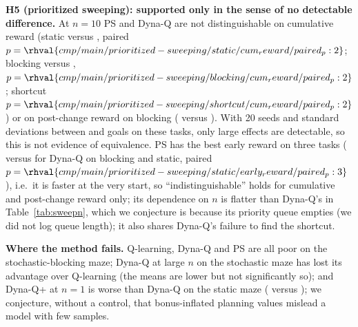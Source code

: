 \textbf{H5 (prioritized sweeping): supported only in the sense of no detectable difference.} At $n=10$ PS and Dyna-Q are not distinguishable on cumulative reward (static  versus , paired $p=\rhval{cmp/main/prioritized-sweeping/static/cum_reward/paired_p:2}$; blocking  versus , $p=\rhval{cmp/main/prioritized-sweeping/blocking/cum_reward/paired_p:2}$; shortcut $p=\rhval{cmp/main/prioritized-sweeping/shortcut/cum_reward/paired_p:2}$) or on post-change reward on blocking ( versus ). With 20 seeds and standard deviations between  and  goals on these tasks, only large effects are detectable, so this is not evidence of equivalence. PS has the best early reward on three tasks ( versus  for Dyna-Q on blocking and static, paired $p=\rhval{cmp/main/prioritized-sweeping/static/early_reward/paired_p:3}$), i.e.\ it is faster at the very start, so ``indistinguishable'' holds for cumulative and post-change reward only; its dependence on $n$ is flatter than Dyna-Q's in Table~\ref{tab:sweepn}, which we conjecture is because its priority queue empties (we did not log queue length); it also shares Dyna-Q's failure to find the shortcut.

\textbf{Where the method fails.} Q-learning, Dyna-Q and PS are all poor on the stochastic-blocking maze; Dyna-Q at large $n$ on the stochastic maze has lost its advantage over Q-learning (the means are lower but not significantly so); and Dyna-Q+ at $n=1$ is worse than Dyna-Q on the static maze ( versus ); we conjecture, without a control, that bonus-inflated planning values mislead a model with few samples.
